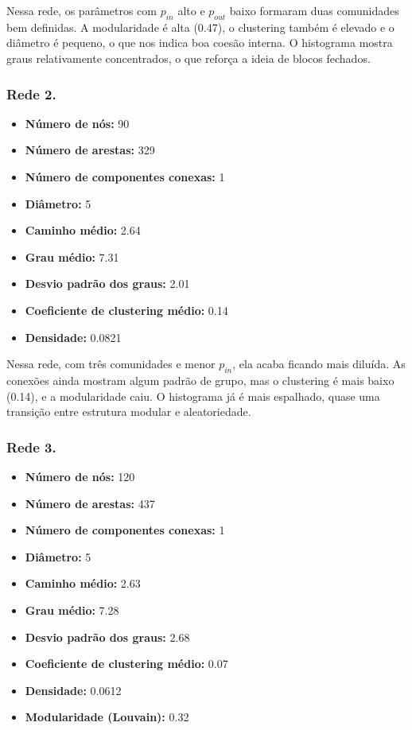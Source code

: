 \documentclass[a4paper]{article}
\begin{document}
Nessa rede, os parâmetros com \(p_{in}\) alto e \(p_{out}\) baixo formaram duas comunidades bem definidas. A modularidade é alta (0.47), o clustering também é elevado e o diâmetro é pequeno, o que nos indica boa coesão interna. O histograma mostra graus relativamente concentrados, o que reforça a ideia de blocos fechados.

\subsubsection{Rede 2.}
\begin{itemize}
    \item \textbf{Número de nós:} 90
    \item \textbf{Número de arestas:} 329
    \item \textbf{Número de componentes conexas:} 1
    \item \textbf{Diâmetro:} 5
    \item \textbf{Caminho médio:} 2.64
    \item \textbf{Grau médio:} 7.31
    \item \textbf{Desvio padrão dos graus:} 2.01
    \item \textbf{Coeficiente de clustering médio:} 0.14
    \item \textbf{Densidade:} 0.0821
\end{itemize}

Nessa rede, com três comunidades e menor \(p_{in}\), ela acaba ficando mais diluída. As conexões ainda mostram algum padrão de grupo, mas o clustering é mais baixo (0.14), e a modularidade caiu. O histograma já é mais espalhado, quase uma transição entre estrutura modular e aleatoriedade.

\subsubsection{Rede 3.}
\begin{itemize}
    \item \textbf{Número de nós:} 120
    \item \textbf{Número de arestas:} 437
    \item \textbf{Número de componentes conexas:} 1
    \item \textbf{Diâmetro:} 5
    \item \textbf{Caminho médio:} 2.63
    \item \textbf{Grau médio:} 7.28
    \item \textbf{Desvio padrão dos graus:} 2.68
    \item \textbf{Coeficiente de clustering médio:} 0.07
    \item \textbf{Densidade:} 0.0612
    \item \textbf{Modularidade (Louvain):} 0.32
\end{itemize}
\end{document}
